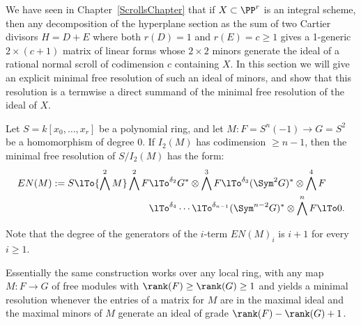 We have seen in Chapter~\ref{ScrollsChapter} that if $X\subset \PP^r$ is an integral scheme, then any decomposition
of the hyperplane section as the sum of two Cartier divisors
 $H = D+E$ where both $r(D) = 1$ and $r(E) = c\geq 1$ gives a 1-generic $2 \times (c+1)$
 matrix of linear forms whose $2\times 2$ minors generate the ideal of a rational normal scroll of codimension $c$
 containing $X$. In this section we will give an explicit minimal free resolution of such an ideal of minors, and show that 
 this resolution is a termwise a direct summand of the
 minimal free resolution of the ideal of $X$.

\begin{theorem}\label{Eagon-Northcott}\label{E-N}
 Let $S = k[x_0,\dots, x_r]$ be a polynomial ring,  and let 
 $M: F = S^n(-1) \to G= S^2$ be a homomorphism of degree 0. If $I_2(M)$ has codimension $\geq n-1$, then the minimal free resolution of $S/I_2(M)$ has the form:
\begin{align*}
EN(M) := 
S \lTo{\bigwedge^2 M} 
 \bigwedge^2 F&
 \lTo^{\delta_{2}}
 G^*\otimes \bigwedge^3 F  \lTo^{\delta_{3}}
  (\Sym^2G)^*\otimes\bigwedge^4F  \\
 &\lTo^{\delta_{4}}\cdots\lTo^{\delta_{n-1}} 
(\Sym^{n-2}G)^*\otimes\bigwedge^nF 
 \lTo 0.
\end{align*}
\end{theorem}

Note that the degree of the generators of the $i$-term $EN(M)_i$ is $i+1$ for every $i\geq 1$.

Essentially the same construction works over any local ring, with any map $M: F\to G$ of free modules
with $\rank(F) \geq \rank(G) \geq 1$
and yields a minimal resolution whenever the entries of a matrix for $M$ are in the maximal
ideal and the maximal minors of $M$ generate an ideal of grade $\rank(F) - \rank(G)+1$.

